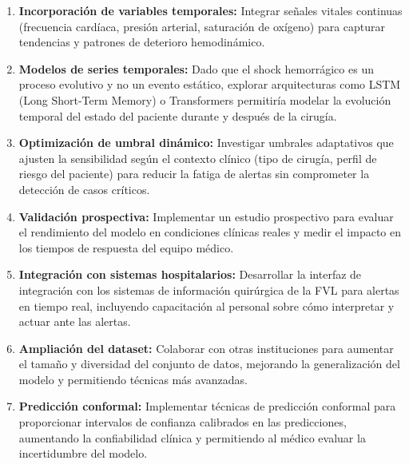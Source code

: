 \documentclass[12pt, letterpaper]{article}
\begin{document}
\begin{enumerate}
    \item \textbf{Incorporación de variables temporales:} Integrar señales vitales continuas (frecuencia cardíaca, presión arterial, saturación de oxígeno) para capturar tendencias y patrones de deterioro hemodinámico.
    
    \item \textbf{Modelos de series temporales:} Dado que el shock hemorrágico es un proceso evolutivo y no un evento estático, explorar arquitecturas como LSTM (Long Short-Term Memory) o Transformers permitiría modelar la evolución temporal del estado del paciente durante y después de la cirugía.
    
    \item \textbf{Optimización de umbral dinámico:} Investigar umbrales adaptativos que ajusten la sensibilidad según el contexto clínico (tipo de cirugía, perfil de riesgo del paciente) para reducir la fatiga de alertas sin comprometer la detección de casos críticos.
    
    \item \textbf{Validación prospectiva:} Implementar un estudio prospectivo para evaluar el rendimiento del modelo en condiciones clínicas reales y medir el impacto en los tiempos de respuesta del equipo médico.
    
    \item \textbf{Integración con sistemas hospitalarios:} Desarrollar la interfaz de integración con los sistemas de información quirúrgica de la FVL para alertas en tiempo real, incluyendo capacitación al personal sobre cómo interpretar y actuar ante las alertas.
    
    \item \textbf{Ampliación del dataset:} Colaborar con otras instituciones para aumentar el tamaño y diversidad del conjunto de datos, mejorando la generalización del modelo y permitiendo técnicas más avanzadas.
    
    \item \textbf{Predicción conformal:} Implementar técnicas de predicción conformal para proporcionar intervalos de confianza calibrados en las predicciones, aumentando la confiabilidad clínica y permitiendo al médico evaluar la incertidumbre del modelo.
\end{enumerate}

\newpage

\end{document}
